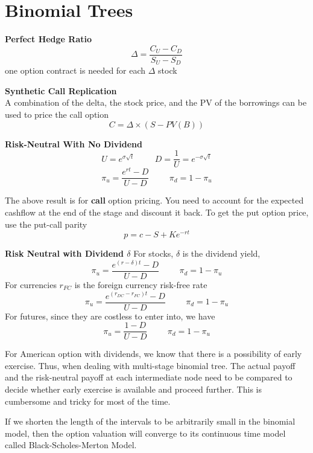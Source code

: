 \documentclass[11pt,fleqn]{book} %
\numberwithin{equation}{section} %
\numberwithin{figure}{section} %
\numberwithin{table}{section} %
\begin{document}
\chapter{Binomial Trees}
\begin{theorem}\textbf{Perfect Hedge Ratio}
$$
\Delta=\frac{C_U-C_D}{S_U-S_D}
$$
one option contract is needed for each $\Delta$ stock
\end{theorem}
 \begin{theorem}\textbf{Synthetic Call Replication}\\
 A combination of the delta, the stock price, and the PV of the borrowings can be used to price the call option
 $$
 C=\Delta\times(S-PV(B))
 $$
 \end{theorem}
 \begin{theorem}\textbf{Risk-Neutral With No Dividend}
 $$
 U=e^{\sigma\sqrt{t}}\hspace{1cm}D=\frac{1}{U}=e^{-\sigma\sqrt{t}}
 $$
 $$
 \pi_u=\frac{e^{rt}-D}{U-D}\hspace{1cm}\pi_d=1-\pi_u
 $$
 \end{theorem}
 \begin{remark}The above result is for \textbf{call} option pricing. You need to account for the expected cashflow at the end of the stage and discount it back. To get the put option price, use the put-call parity 
 $$
 p=c-S+Ke^{-rt}
 $$
 \end{remark}
 \begin{theorem}\textbf{Risk Neutral with Dividend $\delta$}
 For stocks, $\delta$ is the dividend yield, 
 $$
  \pi_u=\frac{e^{(r-\delta)t}-D}{U-D}\hspace{1cm}\pi_d=1-\pi_u
 $$
 For currencies $r_{FC}$ is the foreign currency risk-free rate
 $$
  \pi_u=\frac{e^{(r_{DC}-r_{FC})t}-D}{U-D}\hspace{1cm}\pi_d=1-\pi_u
 $$
 For futures, since they are costless to enter into, we have
 $$
  \pi_u=\frac{1-D}{U-D}\hspace{1cm}\pi_d=1-\pi_u
 $$
 \end{theorem}
 \begin{remark} For American option with dividends, we know that there is a possibility of early exercise. Thus, when dealing with multi-stage binomial tree. The actual payoff and the risk-neutral payoff at each intermediate node need to be compared to decide whether early exercise is available and proceed further. This is cumbersome and tricky for most of the time.
 \end{remark}
 \begin{theorem}
 If we shorten the length of the intervals to be arbitrarily small in the binomial model, then the option valuation will converge to its continuous time model called Black-Scholes-Merton Model.
 \end{theorem}
\end{document}
